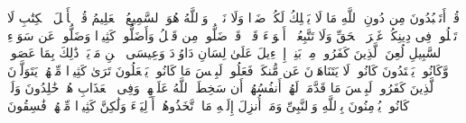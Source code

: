 قُلۡ أَتَعۡبُدُونَ مِن دُونِ ٱللَّهِ مَا لَا یَمۡلِكُ لَكُمۡ ضَرࣰّا وَلَا نَفۡعࣰاۚ وَٱللَّهُ هُوَ ٱلسَّمِیعُ ٱلۡعَلِیمُ%
\stopbuffer
\startbuffer[\q:5:77]
قُلۡ یَٰۤأَهۡلَ ٱلۡكِتَٰبِ لَا تَغۡلُوا۟ فِی دِینِكُمۡ غَیۡرَ ٱلۡحَقِّ وَلَا تَتَّبِعُوۤا۟ أَهۡوَاۤءَ قَوۡمࣲ قَدۡ ضَلُّوا۟ مِن قَبۡلُ وَأَضَلُّوا۟ كَثِیرࣰا وَضَلُّوا۟ عَن سَوَاۤءِ ٱلسَّبِیلِ%
\stopbuffer
\startbuffer[\q:5:78]
لُعِنَ ٱلَّذِینَ كَفَرُوا۟ مِنۢ بَنِیۤ إِسۡرَٰۤءِیلَ عَلَىٰ لِسَانِ دَاوُۥدَ وَعِیسَى ٱبۡنِ مَرۡیَمَۚ ذَٰلِكَ بِمَا عَصَوا۟ وَّكَانُوا۟ یَعۡتَدُونَ%
\stopbuffer
\startbuffer[\q:5:79]
كَانُوا۟ لَا یَتَنَاهَوۡنَ عَن مُّنكَرࣲ فَعَلُوهُۚ لَبِئۡسَ مَا كَانُوا۟ یَفۡعَلُونَ%
\stopbuffer
\startbuffer[\q:5:80]
تَرَىٰ كَثِیرࣰا مِّنۡهُمۡ یَتَوَلَّوۡنَ ٱلَّذِینَ كَفَرُوا۟ۚ لَبِئۡسَ مَا قَدَّمَتۡ لَهُمۡ أَنفُسُهُمۡ أَن سَخِطَ ٱللَّهُ عَلَیۡهِمۡ وَفِی ٱلۡعَذَابِ هُمۡ خَٰلِدُونَ%
\stopbuffer
\startbuffer[\q:5:81]
وَلَوۡ كَانُوا۟ یُؤۡمِنُونَ بِٱللَّهِ وَٱلنَّبِیِّ وَمَاۤ أُنزِلَ إِلَیۡهِ مَا ٱتَّخَذُوهُمۡ أَوۡلِیَاۤءَ وَلَٰكِنَّ كَثِیرࣰا مِّنۡهُمۡ فَٰسِقُونَ%
\stopbuffer
